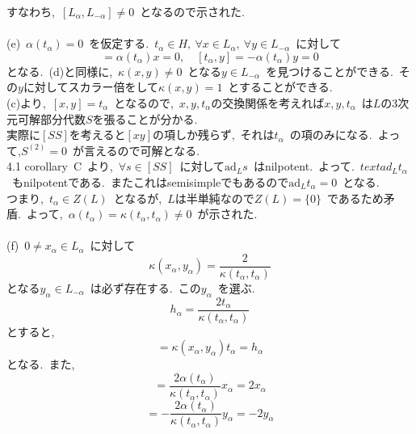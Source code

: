 \documentclass[uplatex,dvipdfmx]{jsarticle}
\begin{document}
\begin{myproof}
    すなわち,~$[L_\alpha, L_{-\alpha}] \neq 0$~となるので示された.\\\\
    (e)~$\alpha(t_\alpha) = 0$~を仮定する.~$t_\alpha \in H,~\forall x \in L_\alpha,~\forall y \in L_{-\alpha}$~に対して 
    \begin{equation*}
        [t_\alpha, x] = \alpha(t_\alpha)x = 0, \quad [t_\alpha, y] = -\alpha(t_\alpha)y = 0
    \end{equation*}
    となる.~(d)と同様に,~$\kappa(x,y) \neq 0$~となる$y \in L_{-\alpha}$~を見つけることができる.~その$y$に対してスカラー倍をして$\kappa(x,y) = 1$~とすることができる.~\\
    (c)より,~$[x,y] = t_\alpha$~となるので,~$x,y,t_\alpha$の交換関係を考えれば$x,y,t_\alpha$~は$L$の3次元可解部分代数$S$を張ることが分かる.\\
    実際に$[SS]$を考えると$[xy]$の項しか残らず,~それは$t_\alpha$~の項のみになる.~よって,$S^{(2)} = 0$~が言えるので可解となる.\\
    4.1 corollary~C~より,~$\forall s \in [SS]$~に対して$\text{ad}_L s$~はnilpotent.~よって.~$text{ad}_L t_\alpha$~もnilpotentである.~またこれはsemisimpleでもあるので$\text{ad}_L t_\alpha =0$~となる.\\
    つまり,~$t_\alpha \in Z(L)$~となるが,~$L$は半単純なので$Z(L) = \{0\}$~であるため矛盾.~よって,~$\alpha(t_\alpha) = \kappa(t_\alpha, t_\alpha) \neq 0$~が示された.\\\\
    (f)~$0 \neq x_\alpha \in L_\alpha$~に対して
    \begin{equation*}
        \kappa(x_\alpha,y_\alpha) = \frac{2}{\kappa(t_\alpha, t_\alpha)}
    \end{equation*}
    となる$y_\alpha \in L_{-\alpha}$~は必ず存在する.~この$y_\alpha$~を選ぶ.~
    \begin{equation*}
        h_\alpha = \frac{2t_\alpha}{ \kappa(t_\alpha, t_\alpha)}
    \end{equation*}
    とすると,~
    \begin{equation*}
        [x_\alpha, y_\alpha] = \kappa(x_\alpha, y_\alpha) t_\alpha = h_\alpha
    \end{equation*}
    となる.~また,
    \begin{equation*}
        [h_\alpha, x_\alpha] = \frac{2\alpha(t_\alpha)}{\kappa(t_\alpha, t_\alpha)} x_\alpha = 2x_\alpha
    \end{equation*}
    \begin{equation*}
        [h_\alpha, y_\alpha] = -\frac{2\alpha(t_\alpha)}{\kappa(t_\alpha, t_\alpha)} y_\alpha = -2y_\alpha

\end{equation*}
\end{myproof}
\end{document}
